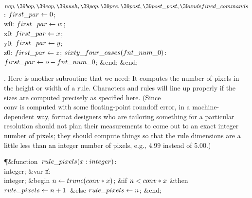 \4$\\{nop},\39\\{bop},\39\\{eop},\39\\{push},\39\\{pop},\39\\{pre},\39\\{post},%
\39\\{post\_post},\39\\{undefined\_commands}$: $\\{first\_par}\K0$;\6
\4\\{w0}: $\\{first\_par}\K\|w$;\6
\4\\{x0}: $\\{first\_par}\K\|x$;\6
\4\\{y0}: $\\{first\_par}\K\|y$;\6
\4\\{z0}: $\\{first\_par}\K\|z$;\6
\4$\\{sixty\_four\_cases}(\\{fnt\_num\_0})$: $\\{first\_par}\K\|o-\\{fnt%
\_num\_0}$;\2\6
\&{end};\6
\&{end};\par
\fi

. Here is another subroutine that we need: It computes the number of
pixels in the height or width of a rule. Characters and rules will line up
properly if the sizes are computed precisely as specified here.  (Since
\\{conv} is computed with some floating-point roundoff error, in a
machine-dependent way, format designers who are tailoring something for a
particular resolution should not plan their measurements to come out to an
exact integer number of pixels; they should compute things so that the
rule dimensions are a little less than an integer number of pixels, e.g.,
4.99 instead of 5.00.)

\Y\P\4\&{function}\1\  $\\{rule\_pixels}(\|x:\\{integer})$: \\{integer};%
\6
\4\&{var} \|n: \\{integer};\2\6
\&{begin} $\|n\K\\{trunc}(\\{conv}\ast\|x)$;\6
\&{if} $\|n<\\{conv}\ast\|x$ \1\&{then}\5
$\\{rule\_pixels}\K\|n+1$\ \&{else} $\\{rule\_pixels}\K\|n$;\2\6
\&{end};\par
\fi

